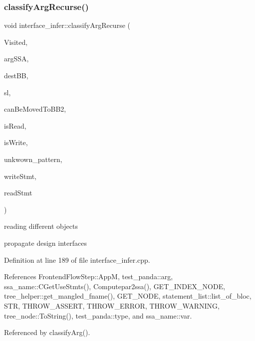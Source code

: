 \subsubsection{\texorpdfstring{classify\+Arg\+Recurse()}{classifyArgRecurse()}}
{\footnotesize\ttfamily void interface\+\_\+infer\+::classify\+Arg\+Recurse (\begin{DoxyParamCaption}\item[{\hyperlink{classCustomOrderedSet}{Custom\+Ordered\+Set}$<$ unsigned $>$ \&}]{Visited,  }\item[{\hyperlink{structssa__name}{ssa\+\_\+name} $\ast$}]{arg\+S\+SA,  }\item[{unsigned int}]{dest\+BB,  }\item[{\hyperlink{structstatement__list}{statement\+\_\+list} $\ast$}]{sl,  }\item[{bool \&}]{can\+Be\+Moved\+To\+B\+B2,  }\item[{bool \&}]{is\+Read,  }\item[{bool \&}]{is\+Write,  }\item[{bool \&}]{unkwown\+\_\+pattern,  }\item[{std\+::list$<$ \hyperlink{tree__node_8hpp_a6ee377554d1c4871ad66a337eaa67fd5}{tree\+\_\+node\+Ref} $>$ \&}]{write\+Stmt,  }\item[{std\+::list$<$ \hyperlink{tree__node_8hpp_a6ee377554d1c4871ad66a337eaa67fd5}{tree\+\_\+node\+Ref} $>$ \&}]{read\+Stmt }\end{DoxyParamCaption})\hspace{0.3cm}{\ttfamily [private]}}

reading different objects

propagate design interfaces 

Definition at line 189 of file interface\+\_\+infer.\+cpp.



References Frontend\+Flow\+Step\+::\+AppM, test\+\_\+panda\+::arg, ssa\+\_\+name\+::\+C\+Get\+Use\+Stmts(), Computepar2ssa(), G\+E\+T\+\_\+\+I\+N\+D\+E\+X\+\_\+\+N\+O\+DE, tree\+\_\+helper\+::get\+\_\+mangled\+\_\+fname(), G\+E\+T\+\_\+\+N\+O\+DE, statement\+\_\+list\+::list\+\_\+of\+\_\+bloc, S\+TR, T\+H\+R\+O\+W\+\_\+\+A\+S\+S\+E\+RT, T\+H\+R\+O\+W\+\_\+\+E\+R\+R\+OR, T\+H\+R\+O\+W\+\_\+\+W\+A\+R\+N\+I\+NG, tree\+\_\+node\+::\+To\+String(), test\+\_\+panda\+::type, and ssa\+\_\+name\+::var.



Referenced by classify\+Arg().

